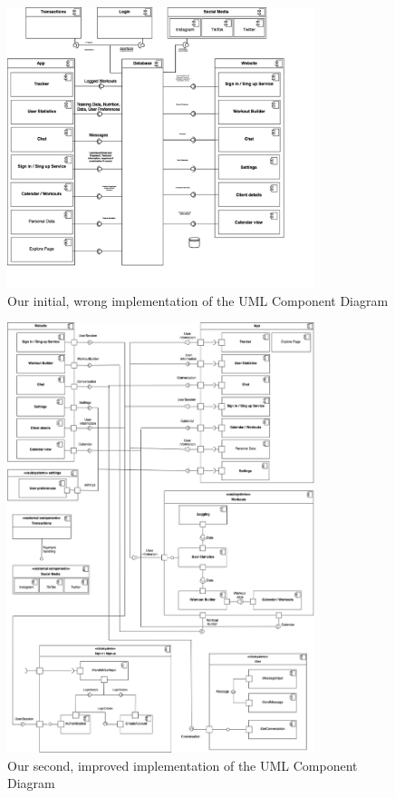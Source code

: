\begin{figure}[H]
    \centering
    \includegraphics[width=0.8\textwidth]{images/old_component_diagram.png}
    \caption{Our initial, wrong implementation of the UML Component Diagram}
    \label{fig:componentwrong}
\end{figure}

\begin{figure}[H]
  \centering
  \includegraphics[width=0.8\textwidth]{images/component_diagram.png}
  \caption{Our second, improved implementation of the UML Component Diagram}
  \label{fig:componentright}
\end{figure}

